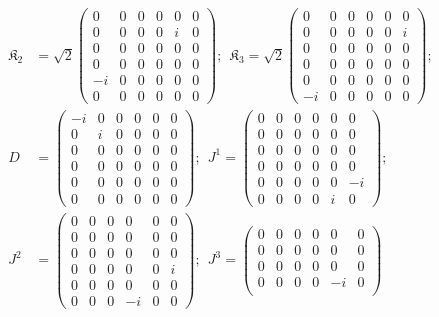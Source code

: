 \documentclass[aps,reprint,notitlepage,nofootinbib,superscriptaddress]{revtex4-1}
\begin{document}
\begin{align}\label{66rep}
     \mathfrak{K}_2&=\sqrt{2}\begin{pmatrix}
    0&0&0&0&0&0\\
    0&0&0&0&i&0\\
    0&0&0&0&0&0\\
    0&0&0&0&0&0\\
    -i&0&0&0&0&0\\
    0&0&0&0&0&0
    \end{pmatrix};~~\mathfrak{K}_3=\sqrt{2}\begin{pmatrix}
    0&0&0&0&0&0\\
    0&0&0&0&0&i\\
    0&0&0&0&0&0\\
    0&0&0&0&0&0\\
    0&0&0&0&0&0\\
    -i&0&0&0&0&0
    \end{pmatrix};~~\nonumber\\
    D&=\begin{pmatrix}
    -i&0&0&0&0&0\\
    0&i&0&0&0&0\\
    0&0&0&0&0&0\\
    0&0&0&0&0&0\\
    0&0&0&0&0&0\\
    0&0&0&0&0&0
    \end{pmatrix};~~J^1=\begin{pmatrix}
    0&0&0&0&0&0\\
    0&0&0&0&0&0\\
    0&0&0&0&0&0\\
  0&0&0&0 & 0 & 0\\
  0&0&0&0 & 0 & -i\\
  0&0&0&0 & i & 0
\end{pmatrix};~~\nonumber\\
J^2&=\begin{pmatrix}
    0&0&0&0&0&0\\
    0&0&0&0&0&0\\
    0&0&0&0&0&0\\
  0&0&0&0 & 0 & i\\
  0&0&0&0 & 0 & 0\\
  0&0&0&-i & 0 & 0
\end{pmatrix};~~J^3=\begin{pmatrix}
    0&0&0&0&0&0\\
    0&0&0&0&0&0\\
    0&0&0&0&0&0\\
  0&0&0&0 & -i & 0\\

\end{pmatrix}
\end{align}
\end{document}
